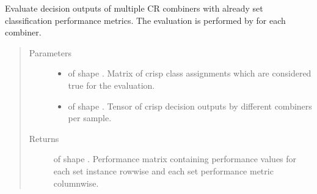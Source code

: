 \documentclass[letterpaper,10pt,english]{sphinxmanual}
\begin{document}
\begin{fulllineitems}
\begin{fulllineitems}
\label{\detokenize{pusion.evaluation.evaluation:pusion.evaluation.evaluation.Evaluation.evaluate_cr_multi_combiner_decision_outputs}}
\sphinxAtStartPar
Evaluate decision outputs of multiple CR combiners with already set classification performance metrics.
The evaluation is performed by {\hyperref[\detokenize{pusion.evaluation.evaluation:pusion.evaluation.evaluation.Evaluation.evaluate_cr_decision_outputs}]{}} for each combiner.
\begin{quote}\begin{description}
\item[{Parameters}] \leavevmode\begin{itemize}
\item {} 
\sphinxAtStartPar
{} \textendash{}  of shape .
Matrix of crisp class assignments which are considered true for the evaluation.

\item {} 
\sphinxAtStartPar
{} \textendash{}  of shape .
Tensor of crisp decision outputs by different combiners per sample.

\end{itemize}

\item[{Returns}] \leavevmode
\sphinxAtStartPar
{} of shape . Performance matrix containing performance values
for each set instance row\sphinxhyphen{}wise and each set performance metric column\sphinxhyphen{}wise.

\end{description}\end{quote}

\end{fulllineitems}



\end{fulllineitems}
\end{document}
